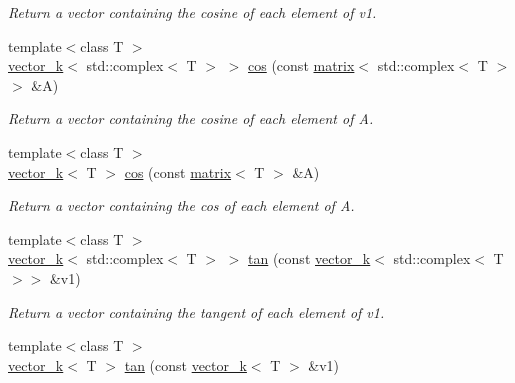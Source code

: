 \begin{DoxyCompactItemize}
\begin{DoxyCompactList}\small\item\em Return a vector containing the cosine of each element of v1. \end{DoxyCompactList}\item 
\hypertarget{namespacekeycpp_acd9678129c9effcca74b8fff47876b1d}{{\footnotesize template$<$class T $>$ }\\\hyperlink{classkeycpp_1_1vector__k}{vector\-\_\-k}$<$ std\-::complex$<$ T $>$ $>$ \hyperlink{namespacekeycpp_acd9678129c9effcca74b8fff47876b1d}{cos} (const \hyperlink{classkeycpp_1_1matrix}{matrix}$<$ std\-::complex$<$ T $>$$>$ \&A)}\label{namespacekeycpp_acd9678129c9effcca74b8fff47876b1d}

\begin{DoxyCompactList}\small\item\em Return a vector containing the cosine of each element of A. \end{DoxyCompactList}\item 
\hypertarget{namespacekeycpp_af8995aedb4c636b77717bb09b37487be}{{\footnotesize template$<$class T $>$ }\\\hyperlink{classkeycpp_1_1vector__k}{vector\-\_\-k}$<$ T $>$ \hyperlink{namespacekeycpp_af8995aedb4c636b77717bb09b37487be}{cos} (const \hyperlink{classkeycpp_1_1matrix}{matrix}$<$ T $>$ \&A)}\label{namespacekeycpp_af8995aedb4c636b77717bb09b37487be}

\begin{DoxyCompactList}\small\item\em Return a vector containing the cos of each element of A. \end{DoxyCompactList}\item 
\hypertarget{namespacekeycpp_a25563b8ed483cdd3bbbaf647beb76ba8}{{\footnotesize template$<$class T $>$ }\\\hyperlink{classkeycpp_1_1vector__k}{vector\-\_\-k}$<$ std\-::complex$<$ T $>$ $>$ \hyperlink{namespacekeycpp_a25563b8ed483cdd3bbbaf647beb76ba8}{tan} (const \hyperlink{classkeycpp_1_1vector__k}{vector\-\_\-k}$<$ std\-::complex$<$ T $>$$>$ \&v1)}\label{namespacekeycpp_a25563b8ed483cdd3bbbaf647beb76ba8}

\begin{DoxyCompactList}\small\item\em Return a vector containing the tangent of each element of v1. \end{DoxyCompactList}\item 
\hypertarget{namespacekeycpp_a90f340395d16b059204d507250945f35}{{\footnotesize template$<$class T $>$ }\\\hyperlink{classkeycpp_1_1vector__k}{vector\-\_\-k}$<$ T $>$ \hyperlink{namespacekeycpp_a90f340395d16b059204d507250945f35}{tan} (const \hyperlink{classkeycpp_1_1vector__k}{vector\-\_\-k}$<$ T $>$ \&v1)}\label{namespacekeycpp_a90f340395d16b059204d507250945f35}


\end{DoxyCompactItemize}
